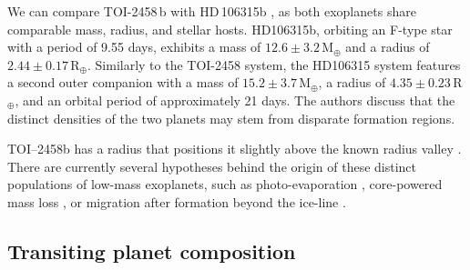\documentclass[traditabstract,longauth]{aa}
\begin{document}
We can compare TOI-2458\,b with HD\,106315b \citep{Barros17}, as both exoplanets share comparable mass, radius, and stellar hosts. HD106315b, orbiting an F-type star with a period of 9.55 days, exhibits a mass of $12.6\pm3.2$\,M$_{\oplus}$ and a radius of $2.44\pm0.17$\,R$_{\oplus}$. Similarly to the TOI-2458 system, the HD106315 system features a second outer companion with a mass of $15.2\pm3.7$\,M$_{\oplus}$, a radius of $4.35\pm0.23$\,R$_{\oplus}$, and an orbital period of approximately 21 days. The authors discuss that the distinct densities of the two planets may stem from disparate formation regions.


TOI–2458b has a radius that positions it slightly above the known radius valley \citep{Fulton17}. There are currently several hypotheses behind the origin of these distinct populations of low-mass exoplanets, such as photo-evaporation \citep{Owen17}, core-powered mass loss \citep{Ginzburg18}, or migration after formation beyond the ice-line \citep{Mordasini09}. 


\subsection{Transiting planet composition}\label{sec:comp}
\end{document}
